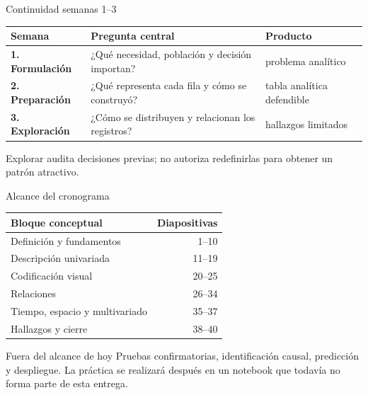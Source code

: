 \documentclass[aspectratio=169,11pt]{beamer}
\begin{document}
\begin{frame}{Continuidad semanas 1--3}
  \small
  \begin{tabularx}{\textwidth}{>{\bfseries}p{} X X}
    \toprule
    Semana & Pregunta central & Producto \\
    \midrule
    1. Formulación & ¿Qué necesidad, población y decisión importan? & problema analítico \\
    2. Preparación & ¿Qué representa cada fila y cómo se construyó? & tabla analítica defendible \\
    3. Exploración & ¿Cómo se distribuyen y relacionan los registros? & hallazgos limitados \\
    \bottomrule
  \end{tabularx}
  \vspace{.5em}
  \centering
  \par\alert{Explorar audita decisiones previas; no autoriza redefinirlas para obtener un patrón atractivo.}
\end{frame}

\begin{frame}{Alcance del cronograma}
  \small
  \begin{tabularx}{\textwidth}{X r}
    \toprule
    Bloque conceptual & Diapositivas \\
    \midrule
    Definición y fundamentos & 1--10 \\
    Descripción univariada & 11--19 \\
    Codificación visual & 20--25 \\
    Relaciones & 26--34 \\
    Tiempo, espacio y multivariado & 35--37 \\
    Hallazgos y cierre & 38--40 \\
    \bottomrule
  \end{tabularx}
  \vfill
  \begin{alertblock}{Fuera del alcance de hoy}
    Pruebas confirmatorias, identificación causal, predicción y despliegue. La práctica se realizará después en un notebook que todavía no forma parte de esta entrega.
  \end{alertblock}
\end{frame}
\end{document}
